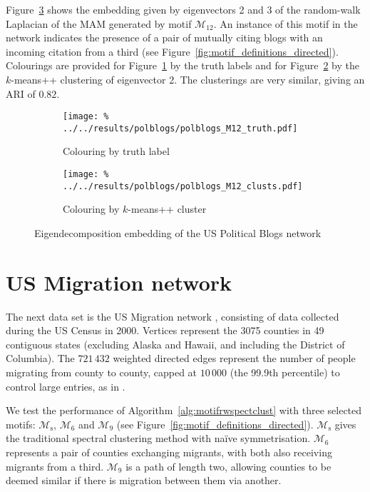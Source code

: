 \documentclass[12pt]{ociamthesis}
\theoremstyle{plain}
\theoremstyle{definition}
\theoremstyle{remark}
\newcommand\ca[1]{\mathcal{#1}}
\begin{document}
Figure~\ref{fig:polblogs_embedding} shows the embedding given by eigenvectors 2
and 3 of the random-walk Laplacian of the MAM generated by motif $\ca{M}_{12}$.
An instance of this motif in the network indicates the presence of a pair of
mutually citing blogs with an incoming citation from a third (see
Figure~\ref{fig:motif_definitions_directed}). Colourings are provided for
Figure~\ref{fig:polblogs_embedding_truth} by the truth labels and for
Figure~\ref{fig:polblogs_embedding_kmeans} by the $k$-means++ clustering of
eigenvector 2. The clusterings are very similar, giving an ARI of $0.82$.

\vspace*{0.5cm}
\begin{figure}[H]
  \begin{subfigure}{.49\textwidth}
    \centering
    \texttt{[image: \%
    ../../results/polblogs/polblogs\_M12\_truth.pdf]}
    \caption{Colouring by truth label}
    \label{fig:polblogs_embedding_truth}
  \end{subfigure}
  \begin{subfigure}{.49\textwidth}
    \centering
    \texttt{[image: \%
    ../../results/polblogs/polblogs\_M12\_clusts.pdf]}
    \caption{Colouring by $k$-means++ cluster}
    \label{fig:polblogs_embedding_kmeans}
  \end{subfigure}
  \caption{Eigendecomposition embedding of the US Political Blogs network}
  \label{fig:polblogs_embedding}
\end{figure}

\pagebreak

\section{US Migration network} \label{sec:motif_migration}

The next data set is the US Migration network \cite{census2000}, consisting of
data collected during the US Census in 2000. Vertices represent the 3075
counties in 49 contiguous states (excluding Alaska and Hawaii, and including
the District of Columbia). The $721\,432$ weighted directed edges represent the
number of people migrating from county to county, capped at $10 \, 000$ (the
99.9th percentile) to control large entries, as in \cite{DirectedClustImbCuts}.

We test the performance of Algorithm~\ref{alg:motifrwspectclust} with three
selected motifs: $\ca{M}_\mathrm{s}$, $\ca{M}_6$ and $\ca{M}_9$ (see
Figure~\ref{fig:motif_definitions_directed}).
$\ca{M}_\mathrm{s}$ gives the traditional spectral clustering method with
na\"ive symmetrisation.
$\ca{M}_6$ represents a pair of counties exchanging migrants, with both also
receiving migrants from a third.
$\ca{M}_9$ is a path of length two, allowing counties to be deemed similar if
there is migration between them via another.
\end{document}
